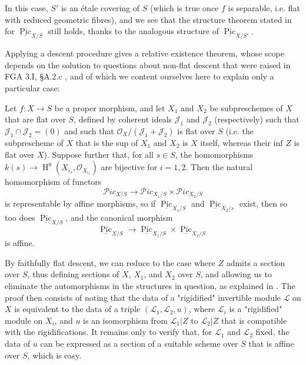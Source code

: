 \begin{cproof}
    In this case, $S'$ is an étale covering of $S$ (which is true once $f$ is separable, i.e. flat with reduced geometric fibres), and we see that the structure theorem stated in  for $\underline{\operatorname{Pic}}_{X/S}$ still holds, thanks to the analogous structure of $\underline{\operatorname{Pic}}_{X/S'}$.
\end{cproof}

Applying a descent procedure gives a relative existence theorem, whose scope depends on the solution to questions about non-flat descent that were raised in FGA 3.I, §A.2.c , and of which we content ourselves here to explain only a particular case:


\begin{proposition}\label{fga3.v-6-proposition-6.3}
    Let $f\colon X\to S$ be a proper morphism, and let $X_1$ and $X_2$ be subpreschemes of $X$ that are flat over $S$, defined by coherent ideals $\mathcal{J}_1$ and $\mathcal{J}_2$ (respectively) such that $\mathcal{J}_1\cap\mathcal{J}_2=(0)$ and such that $\mathcal{O}_X/(\mathcal{J}_1+\mathcal{J}_2)$ is flat over $S$ (i.e. the subprescheme of $X$ that is the sup of $X_1$ and $X_2$ is $X$ itself, whereas their inf $Z$ is flat over $X$).
    Suppose further that, for all $s\in S$, the homomorphisms $k(s)\to\operatorname{H}^0(X_{i_s},\mathcal{O}_{X_{i_s}})$ are bijective for $i=1,2$.
    Then the natural homomorphism of functors
    \[
        \mathcal{P}ic_{X/S}
        \to \mathcal{P}ic_{X_1/S} \times \mathcal{P}ic_{X_2/S}
    \]
    is representable by affine morphisms, so if $\underline{\operatorname{Pic}}_{X_1/S}$ and $\underline{\operatorname{Pic}}_{X_2/s}$ exist, then so too does $\underline{\operatorname{Pic}}_{X/S}$, and the canonical morphism
    \[
        \underline{\operatorname{Pic}}_{X/S}
        \to \underline{\operatorname{Pic}}_{X_1/S} \times \underline{\operatorname{Pic}}_{X_2/S}
    \]
    is affine.
\end{proposition}

\begin{cproof}
    By faithfully flat descent, we can reduce to the case where $Z$ admits a section over $S$, thus defining sections of $X$, $X_1$, and $X_2$ over $S$, and allowing us to eliminate the automorphisms in the structures in question, as explained in .
    The proof then consists of noting that the data of a "rigidified" invertible module $\mathcal{L}$ on $X$ is equivalent to the data of a triple $(\mathcal{L}_1,\mathcal{L}_2,u)$, where $\mathcal{L}_i$ is a "rigidified" module on $X_i$, and $u$ is an isomorphism from $\mathcal{L}_1|Z$ to $\mathcal{L}_2|Z$ that is compatible with the rigidifications.
    It remains only to verify that, for $\mathcal{L}_1$ and $\mathcal{L}_2$ fixed, the data of $u$ can be expressed as a section of a suitable scheme over $S$ that is affine over $S$, which is easy.
\end{cproof}


